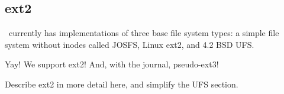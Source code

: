 \subsection{ext2}
\label{sec:modules:ext2}

\Kudos\ currently has implementations of three base file system types: a simple
file system without inodes called JOSFS, Linux ext2, and 4.2 BSD UFS.

Yay! We support ext2! And, with the journal, pseudo-ext3!

Describe ext2 in more detail here, and simplify the UFS section.

